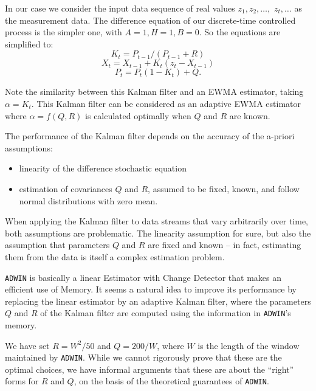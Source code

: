 In our case we consider the input data sequence of real values $z_1, z_2, \ldots,$ $ z_t, \ldots$ 
as the measurement data. The difference equation of our discrete-time controlled process is the simpler one, 
with $A=1, H=1, B=0$. So the equations are simplified to:
%
$$K_t= P_{t-1}/(P_{t-1}+R)$$
$$X_t=X_{t-1}+ K_t(z_t -X_{t-1})$$
$$P_t=P_t(1-K_t)+Q.$$
%

Note the similarity between this Kalman filter and an EWMA estimator, taking $\alpha = K_t$.
This Kalman filter can be considered as an adaptive EWMA estimator where $\alpha = f(Q,R)$ is calculated
optimally when $Q$ and $R$ are known.

The performance of the Kalman filter depends on the accuracy of the a-priori assumptions:
\begin{itemize}
\item linearity of the difference stochastic equation%
\item estimation of covariances $Q$ and $R$, assumed to be fixed, known, 
      and follow normal distributions with zero mean.
\end{itemize}  
%
When applying the Kalman filter to data streams that vary arbitrarily over time, both
assumptions are problematic. The linearity assumption for sure, but also the assumption
that parameters $Q$ and $R$ are fixed and known -- in fact, estimating them from the data
is itself a complex estimation problem. 



{\tt ADWIN} is basically a linear Estimator with Change Detector that makes an efficient use of 
Memory. It seems a natural idea to improve its performance by replacing the linear estimator by 
an adaptive Kalman filter, where the parameters $Q$ and $R$ of the Kalman filter are computed
using the information in {\tt ADWIN}'s memory. 

We have set $R=W^2/50$ and $Q=200/W$, where $W$ is the length of the window
maintained by {\tt ADWIN}. While we cannot rigorously prove that these are the optimal choices, 
we have informal arguments that these are about the ``right'' forms for $R$ and $Q$, on 
the basis of the theoretical guarantees of {\tt ADWIN}. 

